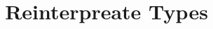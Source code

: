 \documentclass[format=acmsmall, review=false, screen=true]{acmfart} %
\begin{document}
\title[Reinterpreate Types]{Reinterpreate Types}

\maketitle
 



% 


% 
% 

%
\end{document}
